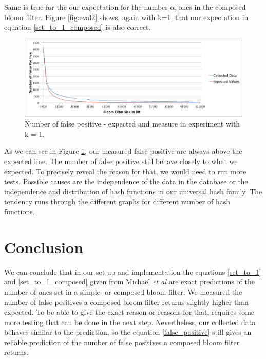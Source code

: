 \documentclass[12]{scrartcl}
\begin{document}
Same is true for the our expectation for the number of ones in the composed bloom filter. Figure \ref{fig:eval2} shows, again with k=1, that our expectation in equation \ref{set_to_1_composed} is also correct.
\begin{figure}[H]
	\begin{center}
		\includegraphics[scale=0.4]{res/1-fp.png}
	\end{center}
	\caption{Number of false positive - expected and measure in experiment with k = 1.}
	\label{fig:eval3}
\end{figure}
As we can see in Figure \ref{fig:eval3}, our measured false positive are always above the expected line. The number of false positive still behave closely to what we expected. To precisely reveal the reason for that, we would need to run more tests. Possible causes are the independence of the data in the database or the independence and distribution of hash functions in our universal hash family. The tendency runs through the different graphs for different number of hash functions.


\section{Conclusion}
We can conclude that in our set up and implementation the equations \ref{set_to_1} and \ref{set_to_1_composed} given from Michael {\em et al}\cite{michael} are exact predictions of the number of ones set in a simple- or composed bloom filter. We measured the number of false positives a composed bloom filter returns slightly higher than expected. To be able to give the exact reason or reasons for that, requires some more testing that can be done in the next step. Nevertheless, our collected data behaves similar to the prediction, so the equation \ref{false_positive} still gives an reliable prediction of the number of false positives a composed bloom filter returns.



\end{document}
